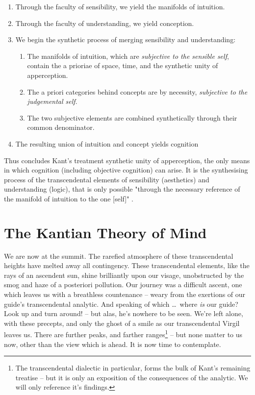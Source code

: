 
\begin{enumerate}
  \item Through the faculty of sensibility, we yield the manifolds of intuition.
  \item Through the faculty of understanding, we yield conception.
  \item We begin the synthetic process of merging sensibility and understanding:
  \begin{enumerate}
    \item The manifolds of intuition, which are \emph{subjective to the sensible self}, contain the a prioriae of space, time, and the synthetic unity of apperception.
    \item The a priori categories behind concepts are by necessity, \emph{subjective to the judgemental self}.
    \item The two subjective elements are combined synthetically through their common denominator.
  \end{enumerate}
  \item The resulting union of intuition and concept yields cognition
\end{enumerate}

\noindent
Thus concludes Kant's treatment synthetic unity of apperception, the only means in which cognition (including objective cognition) can arise. It is the synthesising process of the transcendental elements of sensibility (aesthetics) and understanding (logic), that is only possible "through the necessary reference of the manifold of intuition to the one [self]" \autocite[B140]{hackett}.

\clearpage

\section*{The Kantian Theory of Mind}
We are now at the summit. The rarefied atmosphere of these transcendental heights have melted away all contingency. These transcendental elements, like the rays of an ascendent sun, shine brilliantly upon our visage, unobstructed by the smog and haze of a posteriori pollution. Our journey was a difficult ascent, one which leaves us with a breathless countenance -- weary from the exertions of our guide's transcendental analytic. And speaking of which \ldots\ where \emph{is} our guide? Look up and turn around! -- but alas, he's nowhere to be seen. We're left alone, with these precepts, and only the ghost of a smile as our transcendental Virgil leaves us. There are further peaks, and farther ranges\footnote{The transcendental dialectic in particular, forms the bulk of Kant's remaining treatise -- but it is only an exposition of the consequences of the analytic. We will only reference it's findings.} -- but none matter to us now, other than the view which is ahead. It is now time to contemplate.

